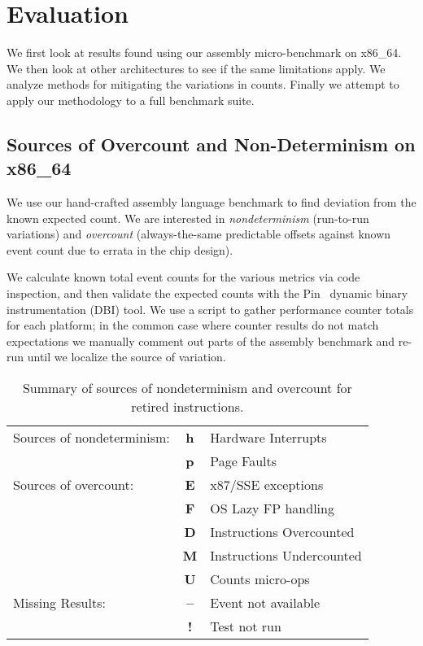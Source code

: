\section{Evaluation}

We first look at results found using our assembly micro-benchmark on x86\_64.  
We then look at other architectures to see if the same limitations apply.  
We analyze methods for mitigating the variations in counts.  
Finally we attempt to apply our methodology to a full benchmark suite.

\subsection{Sources of Overcount and Non-Determinism on x86\_64}

\label{details}

We use our hand-crafted assembly language benchmark
to find deviation from the known expected count.  
We are interested in {\em nondeterminism}
(run-to-run variations) and {\em overcount}
(always-the-same predictable offsets against known event count 
due to errata in the chip design).

We calculate known total event counts for the various metrics
via code inspection, and then validate the expected counts with the 
Pin~\cite{luk+:pldi05} dynamic binary instrumentation (DBI) tool.
We use a script to gather performance counter totals for each platform;
in the common case where counter results do not match expectations we
manually comment out parts of the assembly benchmark and re-run
until we localize the source of variation.  


\begin{table*}[tbp]
\caption{Summary of sources of nondeterminism and overcount for
         retired instructions.}
\label{table:deterministic_events}
\centering

\vspace{2ex}
\begin{tabular}{|l|c|l|}
\hline
Sources of nondeterminism: & {\bf h} & Hardware Interrupts \\
                           & {\bf p} & Page Faults \\
\hline
Sources of overcount:       & {\bf E} & x87/SSE exceptions \\
                           & {\bf F} & OS Lazy FP handling \\
                           & {\bf D} & Instructions Overcounted \\
                           & {\bf M} & Instructions Undercounted \\
                           & {\bf U} & Counts micro-ops \\
\hline
Missing Results:           & {\bf --} & Event not available \\
                           & {\bf !}  & Test not run \\
\hline
\end{tabular}
\end{table*}


